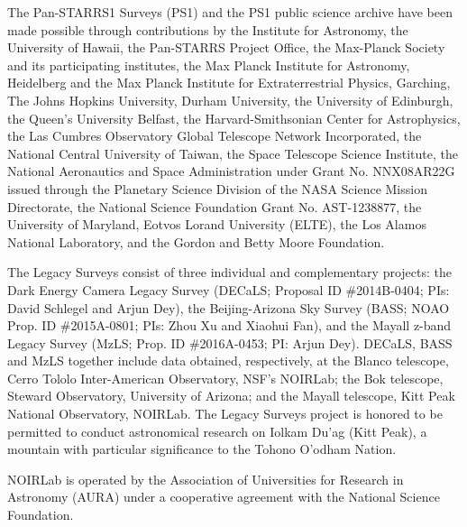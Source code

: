 \documentclass[twocolumn]{aastex63}
\begin{document}
The Pan-STARRS1 Surveys (PS1) and the PS1 public science archive have been made possible through contributions by the Institute for Astronomy, the University of Hawaii, the Pan-STARRS Project Office, the Max-Planck Society and its participating institutes, the Max Planck Institute for Astronomy, Heidelberg and the Max Planck Institute for Extraterrestrial Physics, Garching, The Johns Hopkins University, Durham University, the University of Edinburgh, the Queen's University Belfast, the Harvard-Smithsonian Center for Astrophysics, the Las Cumbres Observatory Global Telescope Network Incorporated, the National Central University of Taiwan, the Space Telescope Science Institute, the National Aeronautics and Space Administration under Grant No. NNX08AR22G issued through the Planetary Science Division of the NASA Science Mission Directorate, the National Science Foundation Grant No. AST-1238877, the University of Maryland, Eotvos Lorand University (ELTE), the Los Alamos National Laboratory, and the Gordon and Betty Moore Foundation.

The Legacy Surveys consist of three individual and complementary projects: the Dark Energy Camera Legacy Survey (DECaLS; Proposal ID \#2014B-0404; PIs: David Schlegel and Arjun Dey), the Beijing-Arizona Sky Survey (BASS; NOAO Prop. ID \#2015A-0801; PIs: Zhou Xu and Xiaohui Fan), and the Mayall z-band Legacy Survey (MzLS; Prop. ID \#2016A-0453; PI: Arjun Dey). DECaLS, BASS and MzLS together include data obtained, respectively, at the Blanco telescope, Cerro Tololo Inter-American Observatory, NSF’s NOIRLab; the Bok telescope, Steward Observatory, University of Arizona; and the Mayall telescope, Kitt Peak National Observatory, NOIRLab. The Legacy Surveys project is honored to be permitted to conduct astronomical research on Iolkam Du’ag (Kitt Peak), a mountain with particular significance to the Tohono O’odham Nation.

NOIRLab is operated by the Association of Universities for Research in Astronomy (AURA) under a cooperative agreement with the National Science Foundation.
\end{document}
